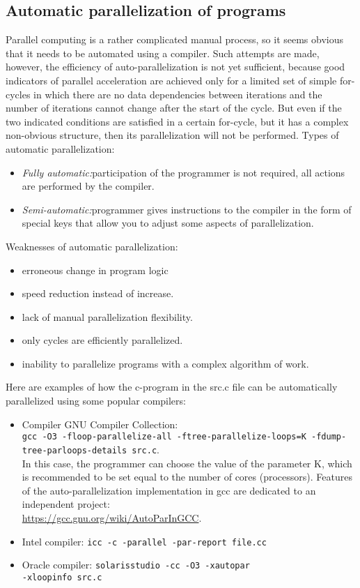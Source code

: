 { %
	\subsection{Automatic parallelization of programs}
	\par Parallel computing is a rather complicated manual process, so it seems obvious that it needs to be automated using a compiler. Such attempts are made, however, the efficiency of auto-parallelization is not yet sufficient, because good indicators of parallel acceleration are achieved only for a limited set of simple for-cycles in which there are no data dependencies between iterations and the number of iterations cannot change after the start of the cycle. But even if the two indicated conditions are satisfied in a certain for-cycle, but it has a complex non-obvious structure, then its parallelization will not be performed. Types of automatic parallelization:
	\begin{itemize}
		\item\textit{Fully automatic:}\quad participation of the programmer is not required, all actions are performed by the compiler.
		\item\textit{Semi-automatic:}\quad programmer gives instructions to the compiler in the form of special keys that allow you to adjust some aspects of parallelization.
	\end{itemize}
	\par Weaknesses of automatic parallelization:
	\begin{itemize}
		\item erroneous change in program logic
		\item speed reduction instead of increase.
		\item lack of manual parallelization flexibility.
		\item only cycles are efficiently parallelized.
		\item inability to parallelize programs with a complex algorithm of work.
	\end{itemize}
	\par Here are examples of how the c-program in the src.c file can be automatically parallelized using some popular compilers:
	\begin{itemize}
		\item Compiler GNU Compiler Collection:	 \\
\texttt{gcc -O3 -floop-parallelize-all -ftree-parallelize-loops=K -fdump-tree-parloops-details src.c}. \\ In this case, the programmer can choose the value of the parameter K, which is recommended to be set equal to the number of cores (processors). Features of the auto-parallelization implementation in gcc are dedicated to an independent project:\\ \url{https://gcc.gnu.org/wiki/AutoParInGCC}. 
		\item Intel compiler:	 
\texttt{icc -c -parallel -par-report file.cc}
		\item Oracle compiler:	 
\texttt{solarisstudio -cc -O3 -xautopar \\-xloopinfo src.c}
	\end{itemize}
}